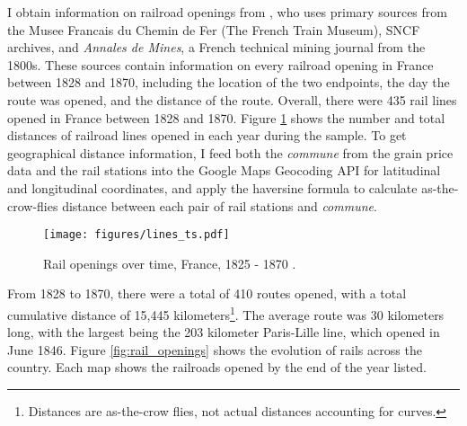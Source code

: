 \documentclass[12pt,twoside]{article}
\begin{document}
I obtain information on railroad openings from \cite{palau2,palau3,palau4}, who uses primary sources from the Musee Francais du Chemin de Fer (The French Train Museum), SNCF archives, and \emph{Annales de Mines}, a French technical mining journal from the 1800s.
These sources contain information on every railroad opening in France between 1828 and 1870, including the location of the two endpoints, the day the route was opened, and the distance of the route.
Overall, there were 435 rail lines opened in France between 1828 and 1870.
Figure \ref{fig:lines_year} shows the number and total distances of railroad lines opened in each year during the sample.
To get geographical distance information, I feed both the \emph{commune} from the grain price data and the rail stations into the Google Maps Geocoding API \citep{google} for latitudinal and longitudinal coordinates, and apply the haversine formula to calculate as-the-crow-flies distance between each pair of rail stations and \emph{commune}.

\begin{figure}[h]
	\centering
	\texttt{[image: figures/lines\_ts.pdf]}
	\caption{Rail openings over time, France, 1825 - 1870 \citep{prices}.}
	\label{fig:lines_year}
\end{figure}

From 1828 to 1870, there were a total of 410 routes opened, with a total cumulative distance of 15,445 kilometers\footnote{Distances are as-the-crow flies, not actual distances accounting for curves.}.
The average route was 30 kilometers long, with the largest being the 203 kilometer Paris-Lille line, which opened in June 1846.
Figure \ref{fig:rail_openings} shows the evolution of rails across the country.
Each map shows the railroads opened by the end of the year listed.
\end{document}
